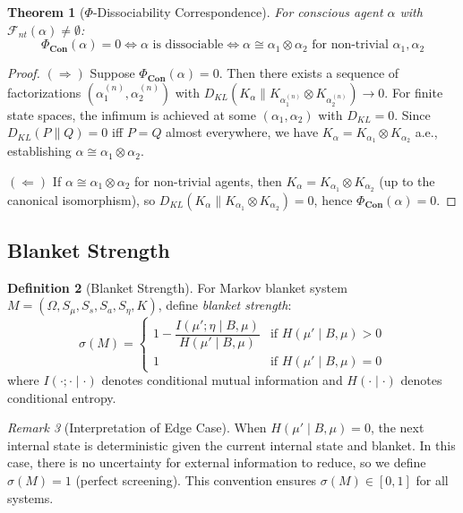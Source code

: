 \documentclass[11pt,a4paper]{article}
\theoremstyle{definition}
\newtheorem{definition}{Definition}[section]
\theoremstyle{plain}
\newtheorem{theorem}[definition]{Theorem}
\theoremstyle{remark}
\newtheorem{remark}[definition]{Remark}
\newcommand{\Con}{\mathbf{Con}}
\begin{document}
\begin{theorem}[$\Phi$-Dissociability Correspondence]\label{thm:phi-dissociability}
For conscious agent $\alpha$ with $\mathcal{F}_{nt}(\alpha) \neq \emptyset$:
\[
\Phi_{\Con}(\alpha) = 0 \iff \alpha \text{ is dissociable} \iff \alpha \cong \alpha_1 \otimes \alpha_2 \text{ for non-trivial } \alpha_1, \alpha_2
\]
\end{theorem}

\begin{proof}
$(\Rightarrow)$ Suppose $\Phi_{\Con}(\alpha) = 0$. Then there exists a sequence of factorizations $(\alpha_1^{(n)}, \alpha_2^{(n)})$ with $D_{KL}(K_\alpha \| K_{\alpha_1^{(n)}} \otimes K_{\alpha_2^{(n)}}) \to 0$. For finite state spaces, the infimum is achieved at some $(\alpha_1, \alpha_2)$ with $D_{KL} = 0$. Since $D_{KL}(P \| Q) = 0$ iff $P = Q$ almost everywhere, we have $K_\alpha = K_{\alpha_1} \otimes K_{\alpha_2}$ a.e., establishing $\alpha \cong \alpha_1 \otimes \alpha_2$.

$(\Leftarrow)$ If $\alpha \cong \alpha_1 \otimes \alpha_2$ for non-trivial agents, then $K_\alpha = K_{\alpha_1} \otimes K_{\alpha_2}$ (up to the canonical isomorphism), so $D_{KL}(K_\alpha \| K_{\alpha_1} \otimes K_{\alpha_2}) = 0$, hence $\Phi_{\Con}(\alpha) = 0$.
\end{proof}

\subsection{Blanket Strength}

\begin{definition}[Blanket Strength]\label{def:blanket-strength}
For Markov blanket system $M = (\Omega, S_\mu, S_s, S_a, S_\eta, K)$, define \emph{blanket strength}:
\[
\sigma(M) = \begin{cases}
1 - \dfrac{I(\mu'; \eta \mid B, \mu)}{H(\mu' \mid B, \mu)} & \text{if } H(\mu' \mid B, \mu) > 0 \\[1em]
1 & \text{if } H(\mu' \mid B, \mu) = 0
\end{cases}
\]
where $I(\cdot; \cdot \mid \cdot)$ denotes conditional mutual information and $H(\cdot \mid \cdot)$ denotes conditional entropy.
\end{definition}

\begin{remark}[Interpretation of Edge Case]
When $H(\mu' \mid B, \mu) = 0$, the next internal state is deterministic given the current internal state and blanket. In this case, there is no uncertainty for external information to reduce, so we define $\sigma(M) = 1$ (perfect screening). This convention ensures $\sigma(M) \in [0, 1]$ for all systems.
\end{remark}
\end{document}
